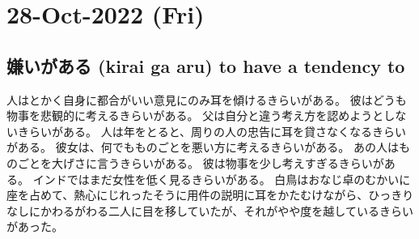 \section{28-Oct-2022 (Fri)}
\subsection{嫌いがある (kirai ga aru) to have a tendency to}

人はとかく自身に都合がいい意見にのみ耳を傾けるきらいがある。
彼はどうも物事を悲観的に考えるきらいがある。
父は自分と違う考え方を認めようとしないきらいがある。
人は年をとると、周りの人の忠告に耳を貸さなくなるきらいがある。
彼女は、何でもものごとを悪い方に考えるきらいがある。
あの人はものごとを大げさに言うきらいがある。
彼は物事を少し考えすぎるきらいがある。
インドではまだ女性を低く見るきらいがある。
白鳥はおなじ卓のむかいに座を占めて、熱心にじれったそうに用件の説明に耳をかたむけながら、ひっきりなしにかわるがわる二人に目を移していたが、それがやや度を越しているきらいがあった。